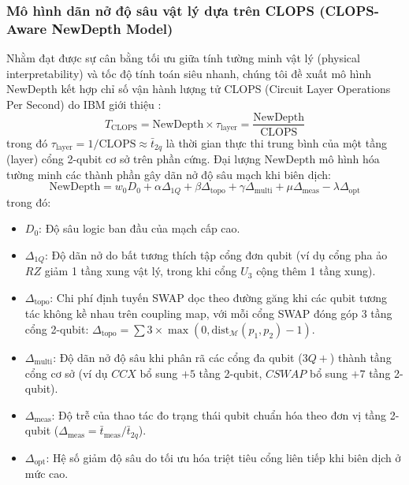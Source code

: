 \documentclass[11pt, a4paper]{article}
\begin{document}
\subsubsection{Mô hình dãn nở độ sâu vật lý dựa trên CLOPS (CLOPS-Aware NewDepth Model)}
Nhằm đạt được sự cân bằng tối ưu giữa tính tường minh vật lý (physical interpretability) và tốc độ tính toán siêu nhanh, chúng tôi đề xuất mô hình NewDepth kết hợp chỉ số vận hành lượng tử CLOPS (Circuit Layer Operations Per Second) do IBM giới thiệu \cite{ma2025understanding}:
\begin{equation}
    \hat{T}_{\text{CLOPS}} = \text{NewDepth} \times \tau_{\text{layer}} = \frac{\text{NewDepth}}{\text{CLOPS}}
\end{equation}
trong đó $\tau_{\text{layer}} = 1/\text{CLOPS} \approx \bar{t}_{2q}$ là thời gian thực thi trung bình của một tầng (layer) cổng 2-qubit cơ sở trên phần cứng. Đại lượng $\text{NewDepth}$ mô hình hóa tường minh các thành phần gây dãn nở độ sâu mạch khi biên dịch:
\begin{equation}
    \text{NewDepth} = w_0 D_0 + \alpha \Delta_{1Q} + \beta \Delta_{\text{topo}} + \gamma \Delta_{\text{multi}} + \mu \Delta_{\text{meas}} - \lambda \Delta_{\text{opt}}
\end{equation}
trong đó:
\begin{itemize}
    \item $D_0$: Độ sâu logic ban đầu của mạch cấp cao.
    \item $\Delta_{1Q}$: Độ dãn nở do bất tương thích tập cổng đơn qubit (ví dụ cổng pha ảo $RZ$ giảm 1 tầng xung vật lý, trong khi cổng $U_3$ cộng thêm 1 tầng xung).
    \item $\Delta_{\text{topo}}$: Chi phí định tuyến SWAP dọc theo đường găng khi các qubit tương tác không kề nhau trên coupling map, với mỗi cổng SWAP đóng góp 3 tầng cổng 2-qubit: $\Delta_{\text{topo}} = \sum 3 \times \max(0, \text{dist}_{\mathcal{M}}(p_1, p_2) - 1)$.
    \item $\Delta_{\text{multi}}$: Độ dãn nở độ sâu khi phân rã các cổng đa qubit ($3Q+$) thành tầng cổng cơ sở (ví dụ $CCX$ bổ sung $+5$ tầng 2-qubit, $CSWAP$ bổ sung $+7$ tầng 2-qubit).
    \item $\Delta_{\text{meas}}$: Độ trễ của thao tác đo trạng thái qubit chuẩn hóa theo đơn vị tầng 2-qubit ($\Delta_{\text{meas}} = \bar{t}_{\text{meas}} / \bar{t}_{2q}$).
    \item $\Delta_{\text{opt}}$: Hệ số giảm độ sâu do tối ưu hóa triệt tiêu cổng liên tiếp khi biên dịch ở mức cao.
\end{itemize}
\end{document}

